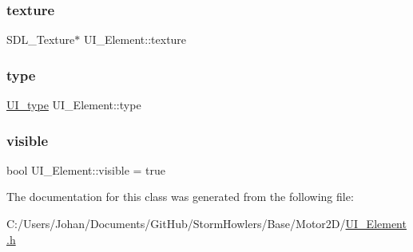 \mbox{\label{class_u_i___element_a3247f386f99b334223a67a7000d821fb}} 
\subsubsection{\texorpdfstring{texture}{texture}}
{\footnotesize\ttfamily S\+D\+L\+\_\+\+Texture$\ast$ U\+I\+\_\+\+Element\+::texture}

\mbox{\label{class_u_i___element_ad40069673afbc9b0fbd596ef164e8e92}} 
\subsubsection{\texorpdfstring{type}{type}}
{\footnotesize\ttfamily \mbox{\hyperlink{class_u_i___element_a7ed595c46c75d53d30fa3813b036cf1e}{U\+I\+\_\+type}} U\+I\+\_\+\+Element\+::type}

\mbox{\label{class_u_i___element_a78aac2800a8d8db3ab76caddf3ece0c4}} 
\subsubsection{\texorpdfstring{visible}{visible}}
{\footnotesize\ttfamily bool U\+I\+\_\+\+Element\+::visible = true}



The documentation for this class was generated from the following file\+:\begin{DoxyCompactItemize}
\item 
C\+:/\+Users/\+Johan/\+Documents/\+Git\+Hub/\+Storm\+Howlers/\+Base/\+Motor2\+D/\mbox{\hyperlink{_u_i___element_8h}{U\+I\+\_\+\+Element.\+h}}\end{DoxyCompactItemize}
